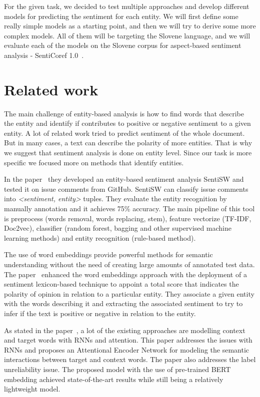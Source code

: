 \documentclass[11pt,a4paper]{article}
\begin{document}
For the given task, we decided to test multiple approaches and develop different models for predicting the sentiment for each entity.
We will first define some really simple models as a starting point, and then we will try to derive some more complex models.
All of them will be targeting the Slovene language, and we will evaluate each of the models on the Slovene corpus for aspect-based sentiment analysis - SentiCoref 1.0~\cite{zitnik2019slovene}.



\section{Related work}

The main challenge of entity-based analysis is how to find words that describe the entity and identify if contributes to positive or negative sentiment to a given entity.
A lot of related work tried to predict sentiment of the whole document.
But in many cases, a text can describe the polarity of more entities.
That is why we suggest that sentiment analysis is done on entity level.
Since our task is more specific we focused more on methods that identify entities.

In the paper~\cite{ding2018entity} they developed an entity-based sentiment analysis SentiSW and tested it on issue comments from GitHub.
SentiSW can classify issue comments into \emph{<sentiment, entity>} tuples.
They evaluate the entity recognition by manually annotation and it achieves 75\% accuracy.
The main pipeline of this tool is preprocess (words removal, words replacing, stem), feature vectorize (TF-IDF, Doc2vec), classifier (random forest, bagging and other supervised machine learning methods) and entity recognition (rule-based method).

The use of word embeddings provide powerful methods for semantic understanding without the need of creating large amounts of annotated test data.
The paper~\cite{sweeney2017multi} enhanced the word embeddings approach with the  deployment of a sentiment lexicon-based technique to appoint a total score that indicates the polarity of opinion in relation to a particular entity.
They associate a given entity with the words describing it and extracting the associated sentiment to try to infer if the text is positive or negative in relation to the entity.

As stated in the paper~\cite{song2019attentional}, a lot of the existing approaches are modelling context and target words with RNNs and attention.
This paper addresses the issues with RNNs and proposes an Attentional Encoder Network for modeling the semantic interactions between target and context words.
The paper also addresses the label unreliability issue.
The proposed model with the use of pre-trained BERT embedding achieved state-of-the-art results while still being a relatively lightweight model.
\end{document}
